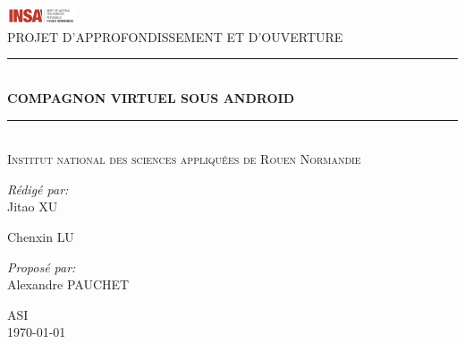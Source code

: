 \documentclass[pdftex, a4paper,12pt]{article}
\newcommand{\HRule}{\rule{\linewidth}{0.5mm}}
\begin{document}
 

\begin{titlepage}
\begin{center}

\includegraphics[width=0.15\textwidth]{./Logo_INSA_RN}\\[1cm]    

\textsc{\Large PROJET D'APPROFONDISSEMENT ET D'OUVERTURE}\\[0.5cm]

\HRule \\[0.8cm]
{\LARGE \bfseries COMPAGNON VIRTUEL SOUS ANDROID}\\[0.4cm]

\HRule \\[1.5cm]

\textsc{Institut national des sciences appliquées de Rouen Normandie}\\[1.5cm]

\begin{minipage}{0.4\textwidth}
\begin{flushleft} \large
\emph{Rédigé par:}\\
Jitao \textsc{XU}

Chenxin \textsc{LU}
\end{flushleft}
\end{minipage}
\begin{minipage}{0.4\textwidth}
\begin{flushright} \large
\emph{Proposé par:} \\
Alexandre \textsc{PAUCHET}
\end{flushright}
\end{minipage}

\vfill

\textsc{\large ASI}\\
{\large \today}

\end{center}
\end{titlepage}
\newpage

\tableofcontents



\newpage



\newpage









\end{document}
